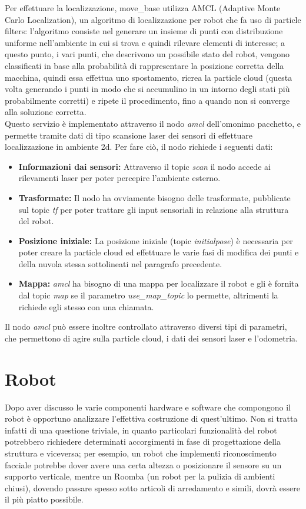 \documentclass[Lau]{sapthesis}
\begin{document}
Per effettuare la localizzazione, move\_base utilizza AMCL (Adaptive Monte Carlo Localization), un algoritmo di localizzazione per robot che fa uso di particle filters: l'algoritmo consiste nel generare un insieme di punti con distribuzione uniforme nell'ambiente in cui si trova e quindi rilevare elementi di interesse; a questo punto, i vari punti, che descrivono un possibile stato del robot, vengono classificati in base alla probabilità di rappresentare la posizione corretta della macchina, quindi essa effettua uno spostamento, ricrea la particle cloud (questa volta generando i punti in modo che si accumulino in un intorno degli stati più probabilmente corretti) e ripete il procedimento, fino a quando non si converge alla soluzione corretta.\\Questo servizio è implementato attraverso il nodo \textit{amcl} dell'omonimo pacchetto, e permette tramite dati di tipo scansione laser dei sensori di effettuare localizzazione in ambiente 2d. Per fare ciò, il nodo richiede i seguenti dati:
\begin{itemize}
\item \textbf{Informazioni dai sensori:} Attraverso il topic \textit{scan} il nodo accede ai rilevamenti laser per poter percepire l'ambiente esterno.
\item \textbf{Trasformate:} Il nodo ha ovviamente bisogno delle trasformate, pubblicate sul topic \textit{tf} per poter trattare gli input sensoriali in relazione alla struttura del robot.
\item \textbf{Posizione iniziale:} La posizione iniziale (topic \textit{initialpose}) è necessaria per poter creare la particle cloud ed effettuare le varie fasi di modifica dei punti e della nuvola stessa sottolineati nel paragrafo precedente.
\item \textbf{Mappa:} \textit{amcl} ha bisogno di una mappa per localizzare il robot e gli è fornita dal topic \textit{map} se il parametro \textit{use\_map\_topic} lo permette, altrimenti la richiede egli stesso con una chiamata.
\end{itemize}
Il nodo \textit{amcl} può essere inoltre controllato attraverso diversi tipi di parametri, che permettono di agire sulla particle cloud, i dati dei sensori laser e l'odometria.
\chapter{Robot}
Dopo aver discusso le varie componenti hardware e software che compongono il robot è opportuno analizzare l'effettiva costruzione di quest'ultimo. Non si tratta infatti di una questione triviale, in quanto particolari funzionalità del robot potrebbero richiedere determinati accorgimenti in fase di progettazione della struttura e viceversa; per esempio, un robot che implementi riconoscimento facciale potrebbe dover avere una certa altezza o posizionare il sensore su un supporto verticale, mentre un Roomba (un robot per la pulizia di ambienti chiusi), dovendo passare spesso sotto articoli di arredamento e simili, dovrà essere il più piatto possibile.
\end{document}

